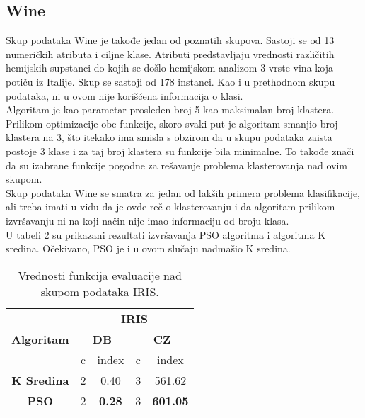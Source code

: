 \documentclass[a4paper,serbian]{symopissr}
\begin{document}
\subsection{Wine}
Skup podataka Wine \cite{uci_wine} je takođe jedan od poznatih skupova. Sastoji se od 13 numeričkih atributa i ciljne klase. Atributi predstavljaju vrednosti različitih hemijskih supstanci do kojih se došlo hemijskom analizom 3 vrste vina koja potiču iz Italije. Skup se sastoji od 178 instanci. Kao i u prethodnom skupu podataka, ni u ovom nije korišćena informacija o klasi.\\
Algoritam je kao parametar prosleđen broj 5 kao maksimalan broj klastera. Prilikom optimizacije obe funkcije, skoro svaki put je algoritam smanjio broj klastera na 3, što itekako ima smisla s obzirom da u skupu podataka zaista postoje 3 klase i za taj broj klastera su funkcije bila minimalne. To takođe znači da su izabrane funkcije pogodne za rešavanje problema klasterovanja nad ovim skupom.\\
Skup podataka Wine se smatra za jedan od lakših primera problema klasifikacije, ali treba imati u vidu da je ovde reč o klasterovanju i da algoritam prilikom izvršavanju ni na koji način nije imao informaciju od broju klasa.\\
U tabeli 2 su prikazani rezultati izvršavanja PSO algoritma i algoritma K sredina. Očekivano, PSO je i u ovom slučaju nadmašio K sredina.

\begin{table}[]
\begin{tabular}{|l|c|c|c|c|}
\hline
\multirow{3}{*}{\textbf{Algoritam}}      & \multicolumn{4}{c|}{\textbf{IRIS}}                                        \\ \cline{2-5} 
                                         & \multicolumn{2}{c|}{\textbf{DB}} & \multicolumn{2}{c|}{\textbf{CZ}} \\ \cline{2-5} 
                                  
     & c         & index                & c & index                                \\ \hline
\multicolumn{1}{|c|}{\textbf{K Sredina}} & 2         & 0.40                & 3 & 561.62                               \\ \hline
\multicolumn{1}{|c|}{\textbf{PSO}}       & 2         & \textbf{0.28}        & 3 & \multicolumn{1}{l|}{\textbf{601.05}} \\ \hline
\end{tabular}
\caption{\label{tab:iris}Vrednosti funkcija evaluacije nad skupom podataka IRIS.}
\end{table}
\end{document}
